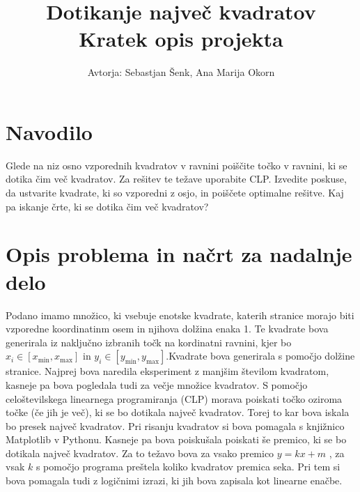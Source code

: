 \documentclass[a4, 12pt]{article}
\begin{document}
\title{ Dotikanje največ kvadratov  \\
  \large Kratek opis projekta}

\author{Avtorja: Sebastjan Šenk, Ana Marija Okorn}

\maketitle

\section{Navodilo}

Glede na niz osno vzporednih kvadratov v ravnini poiščite točko v ravnini, ki se dotika čim več kvadratov.
Za rešitev te težave uporabite CLP. Izvedite poskuse, da ustvarite kvadrate, ki so vzporedni z osjo, in poiščete optimalne rešitve. 
Kaj pa iskanje črte, ki se dotika čim več kvadratov? 

\section{Opis problema in načrt za nadalnje delo}

Podano imamo množico, ki vsebuje enotske kvadrate, katerih stranice morajo biti vzporedne koordinatinm osem in njihova dolžina enaka 1. 
Te kvadrate bova generirala iz naključno izbranih točk na kordinatni ravnini, kjer bo
$x_i \in [x_{\min}, x_{\max}]$  in $y_i \in [y_{\min}, y_{\max}].$Kvadrate bova generirala s pomočjo dolžine stranice. 
Najprej bova naredila eksperiment z manjšim številom kvadratom, kasneje pa bova pogledala tudi za večje množice kvadratov.
S pomočjo celoštevilskega linearnega programiranja (CLP) morava poiskati točko oziroma točke (če jih je več),
ki se bo dotikala največ kvadratov. Torej to kar bova iskala bo presek največ kvadratov. Pri risanju kvadratov si bova pomagala 
s knjižnico Matplotlib v Pythonu.  Kasneje pa bova poiskušala poiskati še premico, ki se bo dotikala največ kvadratov. 
Za to težavo bova za vsako premico $y = kx + m$ , za vsak $k$ s pomočjo programa preštela koliko kvadratov premica seka.
Pri tem si bova pomagala tudi z logičnimi izrazi, ki jih bova zapisala kot linearne enačbe.
\newpage{}
\end{document}
